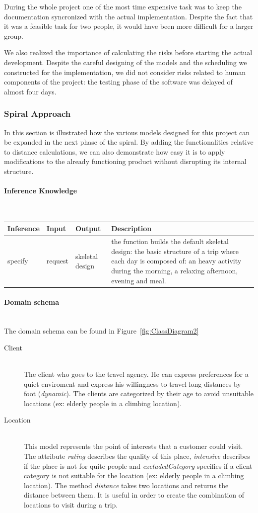 \documentclass[11pt]{article} %
\newcommand{\myparagraph}[1]{\paragraph{#1}\mbox{}\\}
\begin{document}
During the whole project one of the most time expensive task was to keep the documentation syncronized with the actual implementation. Despite the fact that it was a feasible task for two people, it would have been more difficult for a larger group.

We also realized the importance of calculating the risks before starting the actual development. Despite the careful designing of the models and the scheduling we constructed for the implementation, we did not consider risks related to human components of the project: the testing phase of the software was delayed of almost four days.


\subsubsection{Spiral Approach}\label{sec:spiral}
In this section is illustrated how the various models designed for this project can be expanded in the next phase of the spiral. By adding the functionalities relative to distance calculations, we can also demonstrate how easy it is to apply modifications to the already functioning product without disrupting its internal structure.
\newpage
\myparagraph{Inference Knowledge} 


\noindent
\begin{tabular}{|p{2cm}|p{3cm}|p{3cm}|p{6cm}|}
  \hline
Inference   & Input & Output  & Description \\ \hline \hline
specify   & request & skeletal design   & the function builds the default skeletal design: the basic structure of a trip where each day is composed of: an heavy activity during the morning, a relaxing afternoon, evening and meal.
\\ \hline
\end{tabular}

\myparagraph{Domain schema}

The domain schema can be found in Figure~\ref{fig:ClassDiagram2}


\begin{description}
  \item[Client] \hfill \\
  The client who goes to the travel agency. He can express preferences for a quiet enviroment and express his willingness to travel long distances by foot (\emph{dynamic}). The clients are categorized by their age to avoid unsuitable locations (ex: elderly people in a climbing location).

\item[Location] \hfill \\
  This model represents the point of interests that a customer could visit. The attribute \emph{rating} describes the quality of this place, \emph{intensive} describes if the place is not for quite people and \emph{excludedCategory} specifies if a client category is not suitable for the location (ex: elderly people in a climbing location). The method \emph{distance} takes two locations and returns the distance between them. It is useful in order to create the combination of locations to visit during a trip.
\end{description}
\end{document}
